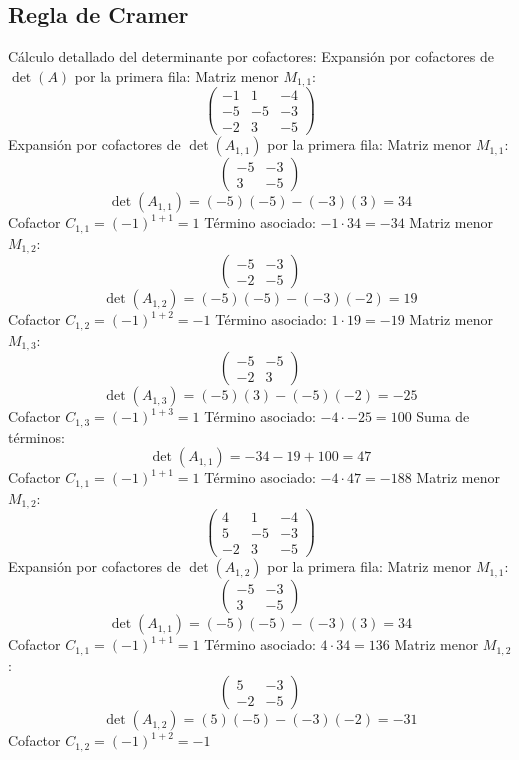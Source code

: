 \documentclass{article}
\begin{document}
\subsection*{Regla de Cramer}
Cálculo detallado del determinante por cofactores:
Expansión por cofactores de $\det(A)$ por la primera fila:
Matriz menor $M_{1,1}$:
\[\begin{pmatrix}-1 & 1 & -4 \\ -5 & -5 & -3 \\ -2 & 3 & -5\end{pmatrix}\]
Expansión por cofactores de $\det(A_{1,1})$ por la primera fila:
Matriz menor $M_{1,1}$:
\[\begin{pmatrix}-5 & -3 \\ 3 & -5\end{pmatrix}\]
\[\det(A_{1,1}) = (-5)(-5) - (-3)(3) = 34\]
Cofactor $C_{1,1} = (-1)^{1+1} = 1$
Término asociado: $ -1 \cdot 34 = -34 $
Matriz menor $M_{1,2}$:
\[\begin{pmatrix}-5 & -3 \\ -2 & -5\end{pmatrix}\]
\[\det(A_{1,2}) = (-5)(-5) - (-3)(-2) = 19\]
Cofactor $C_{1,2} = (-1)^{1+2} = -1$
Término asociado: $ 1 \cdot 19 = -19 $
Matriz menor $M_{1,3}$:
\[\begin{pmatrix}-5 & -5 \\ -2 & 3\end{pmatrix}\]
\[\det(A_{1,3}) = (-5)(3) - (-5)(-2) = -25\]
Cofactor $C_{1,3} = (-1)^{1+3} = 1$
Término asociado: $ -4 \cdot -25 = 100 $
Suma de términos:
\[\det(A_{1,1}) = -34 - 19 + 100 = 47\]
Cofactor $C_{1,1} = (-1)^{1+1} = 1$
Término asociado: $ -4 \cdot 47 = -188 $
Matriz menor $M_{1,2}$:
\[\begin{pmatrix}4 & 1 & -4 \\ 5 & -5 & -3 \\ -2 & 3 & -5\end{pmatrix}\]
Expansión por cofactores de $\det(A_{1,2})$ por la primera fila:
Matriz menor $M_{1,1}$:
\[\begin{pmatrix}-5 & -3 \\ 3 & -5\end{pmatrix}\]
\[\det(A_{1,1}) = (-5)(-5) - (-3)(3) = 34\]
Cofactor $C_{1,1} = (-1)^{1+1} = 1$
Término asociado: $ 4 \cdot 34 = 136 $
Matriz menor $M_{1,2}$:
\[\begin{pmatrix}5 & -3 \\ -2 & -5\end{pmatrix}\]
\[\det(A_{1,2}) = (5)(-5) - (-3)(-2) = -31\]
Cofactor $C_{1,2} = (-1)^{1+2} = -1$
\end{document}
